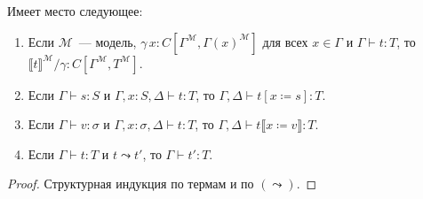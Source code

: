 \begin{theorem}
    Имеет место следующее:
    \begin{enumerate}
        \item Если $\mathcal{M}$~--- модель,
        $\gamma\,x:C[\Gamma^\mathcal{M},
        \Gamma(x)^\mathcal{M}]$ для всех $x\in\Gamma$
        и $\Gamma\vdash t:T$, то $\llbracket t
        \rrbracket^\mathcal{M}/\gamma:
        C[\Gamma^\mathcal{M},T^\mathcal{M}]$.
        \item Если $\Gamma\vdash s:S$ и
        $\Gamma,x:S,\Delta\vdash t:T$, то
        $\Gamma,\Delta\vdash t[x\coloneqq s]:T$.
        \item Если $\Gamma\vdash v:\sigma$ и
        $\Gamma,x:\sigma,\Delta\vdash t:T$, то
        $\Gamma,\Delta\vdash t\llbracket
        x\coloneqq v\rrbracket:T$.
        \item Если $\Gamma\vdash t:T$ и $t\leadsto t'$,
        то $\Gamma\vdash t':T$.
    \end{enumerate}
\end{theorem}
\begin{proof}
    Структурная индукция по термам и по $(\leadsto)$.
\end{proof}

